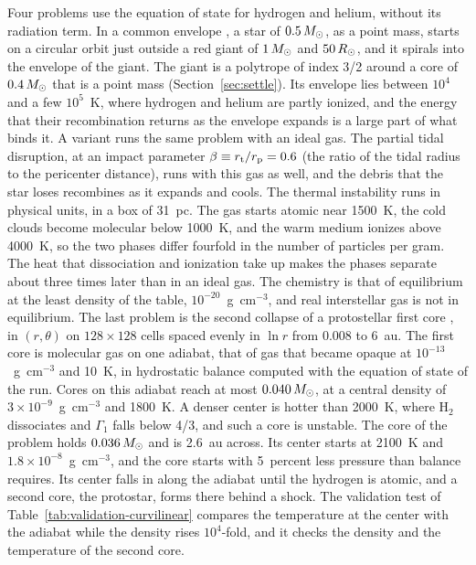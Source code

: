 \documentclass[twocolumn]{aastex701}
\begin{document}
Four problems use the equation of state for hydrogen and helium, without its radiation term. In a common envelope \citep{Ivanova2013}, a star of $0.5\,M_\odot$, as a point mass, starts on a circular orbit just outside a red giant of $1\,M_\odot$ and $50\,R_\odot$, and it spirals into the envelope of the giant. The giant is a polytrope of index 3/2 around a core of $0.4\,M_\odot$ that is a point mass (Section~\ref{sec:settle}). Its envelope lies between $10^4$ and a few $10^5$~K, where hydrogen and helium are partly ionized, and the energy that their recombination returns as the envelope expands is a large part of what binds it. A variant runs the same problem with an ideal gas. The partial tidal disruption, at an impact parameter $\beta \equiv r_{\rm t}/r_{\rm p} = 0.6$ (the ratio of the tidal radius to the pericenter distance), runs with this gas as well, and the debris that the star loses recombines as it expands and cools. The thermal instability runs in physical units, in a box of 31~pc. The gas starts atomic near 1500~K, the cold clouds become molecular below 1000~K, and the warm medium ionizes above 4000~K, so the two phases differ fourfold in the number of particles per gram. The heat that dissociation and ionization take up makes the phases separate about three times later than in an ideal gas. The chemistry is that of equilibrium at the least density of the table, $10^{-20}$~g~cm$^{-3}$, and real interstellar gas is not in equilibrium. The last problem is the second collapse of a protostellar first core \citep{Larson1969, Masunaga2000}, in $(r, \theta)$ on $128 \times 128$ cells spaced evenly in $\ln r$ from 0.008 to 6~au. The first core is molecular gas on one adiabat, that of gas that became opaque at $10^{-13}$~g~cm$^{-3}$ and 10~K, in hydrostatic balance computed with the equation of state of the run. Cores on this adiabat reach at most $0.040\,M_\odot$, at a central density of $3\times10^{-9}$~g~cm$^{-3}$ and 1800~K. A denser center is hotter than 2000~K, where H$_2$ dissociates and $\Gamma_1$ falls below 4/3, and such a core is unstable. The core of the problem holds $0.036\,M_\odot$ and is 2.6~au across. Its center starts at 2100~K and $1.8\times10^{-8}$~g~cm$^{-3}$, and the core starts with 5~percent less pressure than balance requires. Its center falls in along the adiabat until the hydrogen is atomic, and a second core, the protostar, forms there behind a shock. The validation test of Table~\ref{tab:validation-curvilinear} compares the temperature at the center with the adiabat while the density rises $10^4$-fold, and it checks the density and the temperature of the second core.
\end{document}
